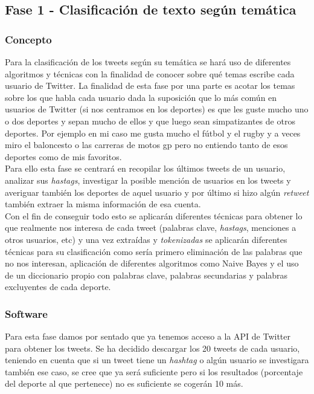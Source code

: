 \documentclass[../all.tex]{subfiles}
\begin{document}
\newpage    
\subsection{Fase 1 - Clasificación de texto según temática}
    \subsubsection{Concepto}
    	Para la clasificación de los tweets según su temática se hará uso de diferentes algoritmos y técnicas con la finalidad de conocer sobre qué temas escribe cada usuario de Twitter. La finalidad de esta fase por una parte es acotar los temas sobre los que habla cada usuario dada la suposición que lo más común en usuarios de Twitter (si nos centramos en los deportes) es que les guste mucho uno o dos deportes y sepan mucho de ellos y que luego sean simpatizantes de otros deportes. Por ejemplo en mi caso me gusta mucho el fútbol y el rugby y a veces miro el baloncesto o las carreras de motos gp pero no entiendo tanto de esos deportes como de mis favoritos. \\
    	
    	Para ello esta fase se centrará en recopilar los últimos tweets de un usuario, analizar sus \textit{hastags}, investigar la posible mención de usuarios en los tweets y averiguar también los deportes de aquel usuario y por último  si hizo algún \textit{retweet} también extraer la misma información de esa cuenta.\\
    	
    	Con el fin de conseguir todo esto se aplicarán diferentes técnicas para obtener lo que realmente nos interesa de cada tweet (palabras clave, \textit{hastags}, menciones a otros usuarios, etc) y una vez extraídas y \textit{tokenizadas} se aplicarán diferentes técnicas para su clasificación como sería primero eliminación de las palabras que no nos interesan, aplicación de diferentes algoritmos como Naive Bayes y el uso de un diccionario propio con palabras clave, palabras secundarias y palabras excluyentes de cada deporte.
    	
    \newpage
    \subsubsection{Software}
    	Para esta fase damos por sentado que ya tenemos acceso a la API de Twitter para obtener los tweets. Se ha decidido descargar los 20 tweets de cada usuario, teniendo en cuenta que si un tweet tiene un \textit{hashtag} o algún usuario se investigara también ese caso, se cree que ya será suficiente pero si los resultados (porcentaje del deporte al que pertenece) no es suficiente se cogerán 10 más.\\
    	
\end{document}

